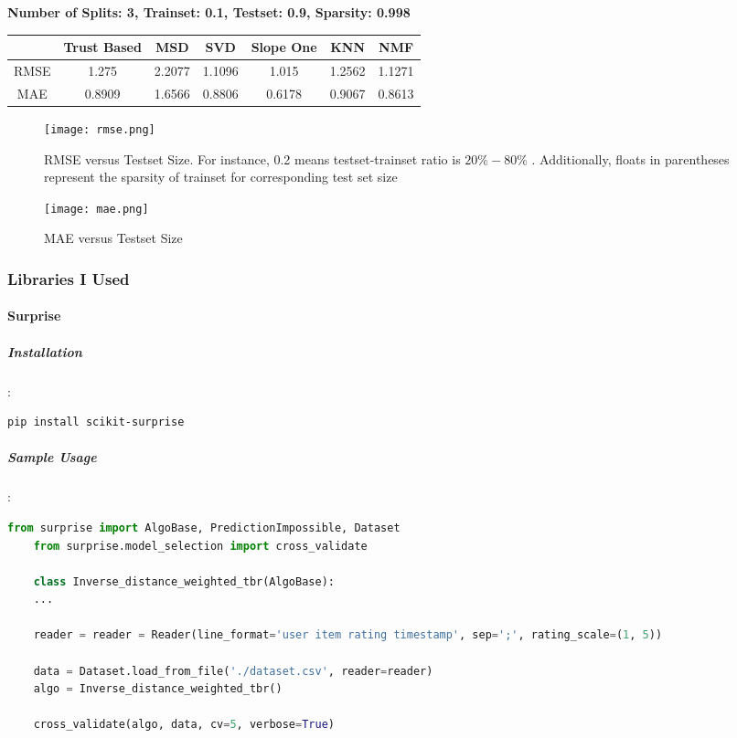 	\vspace{1cm}
	\textbf{Number of Splits: 3, Trainset: 0.1, Testset: 0.9, Sparsity: 0.998}
	\begin{center}
		\begin{tabular}{ | c | c | c | c | c | c | c |}
			\hline
			& Trust Based & MSD & SVD & Slope One & KNN & NMF\\ 
			\hline
			RMSE& 1.275& 2.2077& 1.1096&1.015 & 1.2562& 1.1271\\
			\hline
			MAE& 0.8909 &1.6566 & 0.8806&0.6178 & 0.9067&0.8613\\
			\hline
		\end{tabular}
	\end{center} 

\begin{figure}[H]
	\centering
	\texttt{[image: rmse.png]}
	\caption{RMSE versus Testset Size. For instance, 0.2 means testset-trainset ratio is $20\%-80\%$ . Additionally, floats in parentheses represent the sparsity of trainset for corresponding test set size}
	\label{fig:rmse}
\end{figure}

\begin{figure}[H]
	\centering
	\texttt{[image: mae.png]}
	\caption{MAE versus Testset Size}
	\label{fig:mae}
\end{figure}
	
	\subsubsection{Libraries I Used}
	\paragraph{Surprise \cite{Surprise}}
	\label{surprise}
	\subparagraph{Installation}:
	\begin{lstlisting}[language=bash]
	pip install scikit-surprise
	\end{lstlisting}
	
	\subparagraph{Sample Usage}:
	\begin{lstlisting}[language=python, caption=Surprise example]
	from surprise import AlgoBase, PredictionImpossible, Dataset
	from surprise.model_selection import cross_validate
	
	class Inverse_distance_weighted_tbr(AlgoBase):
	...
	
	reader = reader = Reader(line_format='user item rating timestamp', sep=';', rating_scale=(1, 5))
	
	data = Dataset.load_from_file('./dataset.csv', reader=reader)
	algo = Inverse_distance_weighted_tbr()
	
	cross_validate(algo, data, cv=5, verbose=True)
	\end{lstlisting}
	
